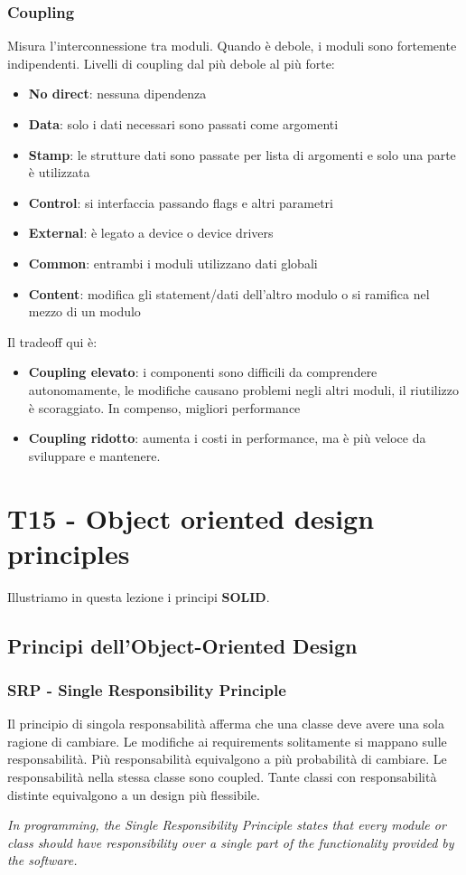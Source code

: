 \documentclass[11pt]{article}
\begin{document}
\subsubsection{Coupling}
Misura l'interconnessione tra moduli. Quando è debole, i moduli sono fortemente indipendenti. Livelli di coupling dal più debole al più forte:
\begin{itemize}
    \item \textbf{No direct}: nessuna dipendenza
    \item \textbf{Data}: solo i dati necessari sono passati come argomenti
    \item \textbf{Stamp}: le strutture dati sono passate per lista di argomenti e solo una parte è utilizzata 
    \item \textbf{Control}: si interfaccia passando flags e altri parametri 
    \item \textbf{External}: è legato a device o device drivers
    \item \textbf{Common}: entrambi i moduli utilizzano dati globali
    \item \textbf{Content}: modifica gli statement/dati dell'altro modulo o si ramifica nel mezzo di un modulo
\end{itemize}
Il tradeoff qui è:
\begin{itemize}
    \item \textbf{Coupling elevato}: i componenti sono difficili da comprendere autonomamente, le modifiche causano problemi negli altri moduli, il riutilizzo è scoraggiato. In compenso, migliori performance 
    \item \textbf{Coupling ridotto}: aumenta i costi in performance, ma è più veloce da sviluppare e mantenere.
\end{itemize}
\section{T15 - Object oriented design principles}
Illustriamo in questa lezione i principi \textbf{SOLID}.
\subsection{Principi dell'Object-Oriented Design}
\subsubsection{SRP - Single Responsibility Principle}
Il principio di singola responsabilità afferma che una classe deve avere una sola ragione di cambiare. Le modifiche ai requirements solitamente si mappano sulle responsabilità. Più responsabilità equivalgono a più probabilità di cambiare. Le responsabilità nella stessa classe sono coupled.
Tante classi con responsabilità distinte equivalgono a un design più flessibile. 
\begin{center}
    \textit{In programming, the Single Responsibility Principle states that every module or class should have responsibility over a single part of the functionality provided by the software.}
\end{center}
\end{document}
